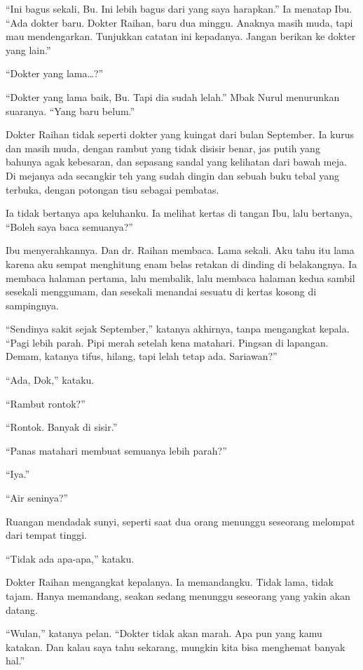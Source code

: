 \documentclass[11pt,twoside,openany]{book}
\makeatletter
\newcommand{\scenebreak}{\par\vspace{0.9em}{\centering\textsc{*\hspace{0.7em}*\hspace{0.7em}*}\par}\vspace{0.9em}\@afterindentfalse\@afterheading}
\makeatother
\begin{document}
``Ini bagus sekali, Bu. Ini lebih bagus dari yang saya harapkan.'' Ia menatap Ibu. ``Ada dokter baru. Dokter Raihan, baru dua minggu. Anaknya masih muda, tapi mau mendengarkan. Tunjukkan catatan ini kepadanya. Jangan berikan ke dokter yang lain.''

``Dokter yang lama\ldots?''

``Dokter yang lama baik, Bu. Tapi dia sudah lelah.'' Mbak Nurul menurunkan suaranya. ``Yang baru belum.''

\scenebreak
Dokter Raihan tidak seperti dokter yang kuingat dari bulan September. Ia kurus dan masih muda, dengan rambut yang tidak disisir benar, jas putih yang bahunya agak kebesaran, dan sepasang sandal yang kelihatan dari bawah meja. Di mejanya ada secangkir teh yang sudah dingin dan sebuah buku tebal yang terbuka, dengan potongan tisu sebagai pembatas.

Ia tidak bertanya apa keluhanku. Ia melihat kertas di tangan Ibu, lalu bertanya, ``Boleh saya baca semuanya?''

Ibu menyerahkannya. Dan dr. Raihan membaca. Lama sekali. Aku tahu itu lama karena aku sempat menghitung enam belas retakan di dinding di belakangnya. Ia membaca halaman pertama, lalu membalik, lalu membaca halaman kedua sambil sesekali menggumam, dan sesekali menandai sesuatu di kertas kosong di sampingnya.

``Sendinya sakit sejak September,'' katanya akhirnya, tanpa mengangkat kepala. ``Pagi lebih parah. Pipi merah setelah kena matahari. Pingsan di lapangan. Demam, katanya tifus, hilang, tapi lelah tetap ada. Sariawan?''

``Ada, Dok,'' kataku.

``Rambut rontok?''

``Rontok. Banyak di sisir.''

``Panas matahari membuat semuanya lebih parah?''

``Iya.''

``Air seninya?''

Ruangan mendadak sunyi, seperti saat dua orang menunggu seseorang melompat dari tempat tinggi.

``Tidak ada apa-apa,'' kataku.

Dokter Raihan mengangkat kepalanya. Ia memandangku. Tidak lama, tidak tajam. Hanya memandang, seakan sedang menunggu seseorang yang yakin akan datang.

``Wulan,'' katanya pelan. ``Dokter tidak akan marah. Apa pun yang kamu katakan. Dan kalau saya tahu sekarang, mungkin kita bisa menghemat banyak hal.''
\end{document}
